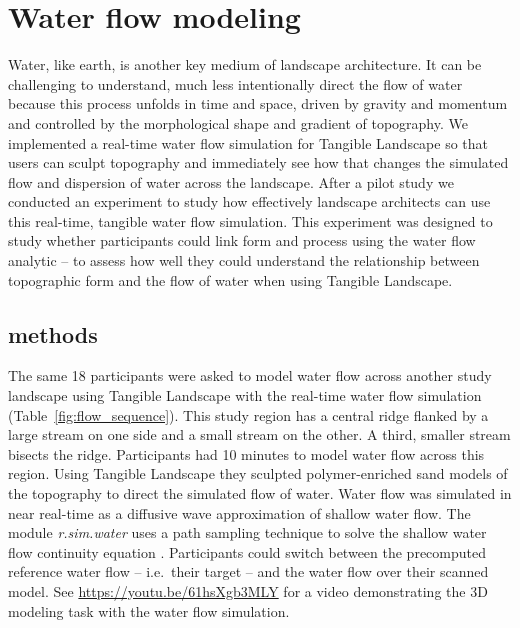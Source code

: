 \documentclass[Afour,sagev,times]{sagej} %
\begin{document}




\section{Water flow modeling}

Water, like earth, is another key medium of landscape architecture.
It can be challenging to understand, much less intentionally direct
the flow of water because this process
unfolds in time and space, 
driven by gravity and momentum and
controlled by the morphological shape and gradient of topography.
We implemented a real-time water flow simulation 
for Tangible Landscape 
so that users can sculpt topography 
and immediately see how that changes 
the simulated flow and dispersion of water
across the landscape.
After a pilot study \cite{Harmon2016}
we conducted an experiment to study 
how effectively landscape architects
can use this real-time, tangible water flow simulation.
This experiment was designed to study whether
participants could link form and process
using the water flow analytic -- to assess
how well they could understand the relationship 
between topographic form 
and the flow of water 
when using Tangible Landscape.

\subsection{methods}
The same 18 participants were asked to model water flow 
across another study landscape
using Tangible Landscape 
with the real-time water flow simulation 
(Table~\ref{fig:flow_sequence}).
This study region has a central ridge 
flanked by a large stream on one side 
and a small stream on the other.  
A third, smaller stream bisects the ridge.
Participants had 10 minutes to model water flow across this region.
Using Tangible Landscape
they sculpted polymer-enriched sand models of the topography
to direct the simulated flow of water.  
Water flow was simulated in near real-time 
as a diffusive wave approximation of shallow water flow.
The module \textit{r.sim.water} \cite{r.sim.water}
uses a path sampling technique to solve 
the shallow water flow continuity equation \cite{Mitasova2004}.
Participants could switch between 
the precomputed reference water flow -- i.e.~their target -- 
and the water flow over their scanned model.
%
See \url{https://youtu.be/61hsXgb3MLY}
for a video demonstrating the 3D modeling task 
with the water flow simulation.
\end{document}
